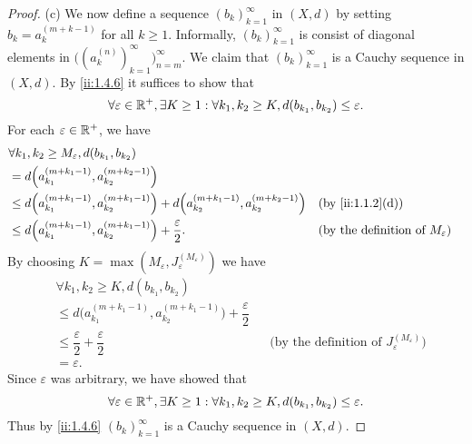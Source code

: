 \begin{proof}{(c)}
  We now define a sequence \((b_k)_{k = 1}^\infty\) in \((X, d)\) by setting \(b_k = a_k^{(m + k - 1)}\) for all \(k \geq 1\).
  Informally, \((b_k)_{k = 1}^\infty\) is consist of diagonal elements in \(\big((a_k^{(n)})_{k = 1}^\infty\big)_{n = m}^\infty\).
  We claim that \((b_k)_{k = 1}^\infty\) is a Cauchy sequence in \((X, d)\).
  By \cref{ii:1.4.6} it suffices to show that
  \[
    \forall \varepsilon \in \mathbb{R}^+, \exists K \geq 1 : \forall k_1, k_2 \geq K, d(b_{k_1}, b_{k_2}) \leq \varepsilon.
  \]
  For each \(\varepsilon \in \mathbb{R}^+\), we have
  \begin{align*}
     & \forall k_1, k_2 \geq M_\varepsilon, d(b_{k_1}, b_{k_2})                                                                                                                            \\
     & = d\Big(a_{k_1}^{(m + k_1 - 1)}, a_{k_2}^{(m + k_2 - 1)}\Big)                                                                                                                       \\
     & \leq d\Big(a_{k_1}^{(m + k_1 - 1)}, a_{k_2}^{(m + k_1 - 1)}\Big) + d\Big(a_{k_2}^{(m + k_1 - 1)}, a_{k_2}^{(m + k_2 - 1)}\Big) &  & \by{ii:1.1.2}[d]                                \\
     & \leq d\Big(a_{k_1}^{(m + k_1 - 1)}, a_{k_2}^{(m + k_1 - 1)}\Big) + \dfrac{\varepsilon}{2}.                                     &  & \text{(by the definition of \(M_\varepsilon\))}
  \end{align*}
  By choosing \(K = \max(M_\varepsilon, J_\varepsilon^{(M_\varepsilon)})\) we have
  \begin{align*}
     & \forall k_1, k_2 \geq K, d(b_{k_1}, b_{k_2})                                                                                                                     \\
     & \leq d\Big(a_{k_1}^{(m + k_1 - 1)}, a_{k_2}^{(m + k_1 - 1)}\Big) + \dfrac{\varepsilon}{2}                                                                        \\
     & \leq \dfrac{\varepsilon}{2} + \dfrac{\varepsilon}{2}                                      &  & \text{(by the definition of \(J_\varepsilon^{(M_\varepsilon)}\))} \\
     & = \varepsilon.
  \end{align*}
  Since \(\varepsilon\) was arbitrary, we have showed that
  \[
    \forall \varepsilon \in \mathbb{R}^+, \exists K \geq 1 : \forall k_1, k_2 \geq K, d(b_{k_1}, b_{k_2}) \leq \varepsilon.
  \]
  Thus by \cref{ii:1.4.6} \((b_k)_{k = 1}^\infty\) is a Cauchy sequence in \((X, d)\).


\end{proof}
